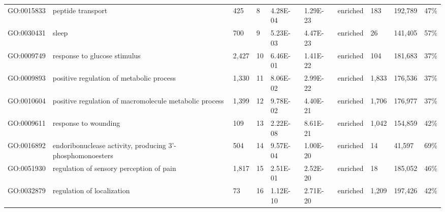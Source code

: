 \begin{sidewaystable}[!ht]
\begin{tabular}{lp{2cm}p{1cm}p{1cm}p{1.25cm}p{1.25cm}p{1cm}p{1.25cm}p{1.25cm}p{1.25cm}}
GO:0015833     & peptide transport                                         & 425                        & 8                   & 4.28E-04                      & 1.29E-23               & enriched        & 183                  & 192,789                & 47\%                     \\
GO:0030431     & sleep                                                     & 700                        & 9                   & 5.23E-03                      & 4.47E-23               & enriched        & 26                   & 141,405                & 57\%                     \\
GO:0009749     & response to glucose stimulus                              & 2,427                      & 10                  & 6.46E-01                      & 1.41E-22               & enriched        & 104                  & 181,683                & 37\%                     \\
GO:0009893     & positive regulation of metabolic process                  & 1,330                      & 11                  & 8.06E-02                      & 2.99E-22               & enriched        & 1,833                & 176,536                & 37\%                     \\
GO:0010604     & positive regulation of macromolecule metabolic process    & 1,399                      & 12                  & 9.78E-02                      & 4.40E-21               & enriched        & 1,706                & 176,977                & 37\%                     \\
GO:0009611     & response to wounding                                      & 109                        & 13                  & 2.22E-08                      & 8.61E-21               & enriched        & 1,042                & 154,859                & 42\%                     \\
GO:0016892     & endoribonuclease activity, producing 3'-phosphomonoesters & 504                        & 14                  & 9.57E-04                      & 1.00E-20               & enriched        & 14                   & 41,597                 & 69\%                     \\
GO:0051930     & regulation of sensory perception of pain                  & 1,817                      & 15                  & 2.51E-01                      & 2.52E-20               & enriched        & 18                   & 185,052                & 46\%                     \\
GO:0032879     & regulation of localization                                & 73                         & 16                  & 1.12E-10                      & 2.71E-20               & enriched        & 1,209                & 197,426                & 42\%                     \\

\end{tabular}
\end{sidewaystable}
